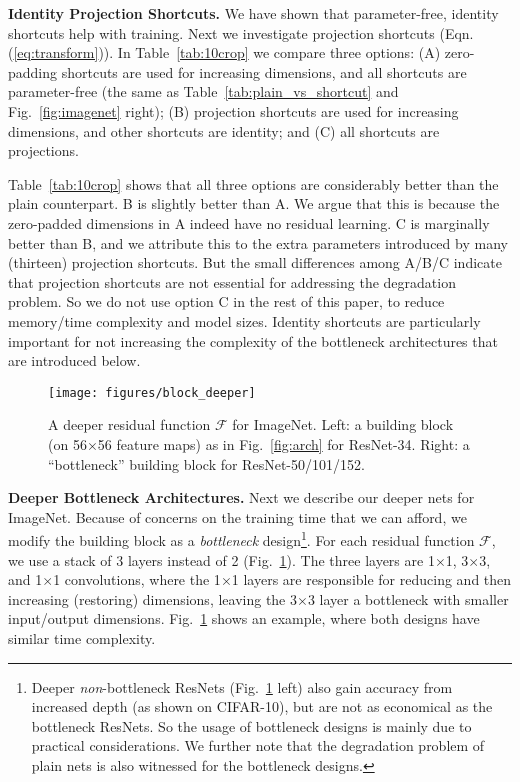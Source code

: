 \vspace{6pt}
\noindent\textbf{Identity \vs Projection Shortcuts.}
We have shown that parameter-free, identity shortcuts help with training. Next we investigate projection shortcuts (Eqn.(\ref{eq:transform})).
In Table~\ref{tab:10crop} we compare three options: (A) zero-padding shortcuts are used for increasing dimensions, and all shortcuts are parameter-free (the same as Table~\ref{tab:plain_vs_shortcut} and Fig.~\ref{fig:imagenet} right); (B) projection shortcuts are used for increasing dimensions, and other shortcuts are identity; and (C) all shortcuts are projections.

Table~\ref{tab:10crop} shows that all three options are considerably better than the plain counterpart.
B is slightly better than A. We argue that this is because the zero-padded dimensions in A indeed have no residual learning. C is marginally better than B, and we attribute this to the extra parameters introduced by many (thirteen) projection shortcuts. But the small differences among A/B/C indicate that projection shortcuts are not essential for addressing the degradation problem. So we do not use option C in the rest of this paper, to reduce memory/time complexity and model sizes. Identity shortcuts are particularly important for not increasing the complexity of the bottleneck architectures that are introduced below.


\begin{figure}[t]
\begin{center}
\hspace{12pt}
\texttt{[image: figures/block\_deeper]}
\end{center}
\caption{A deeper residual function $\mathcal{F}$ for ImageNet. Left: a building block (on 56$\times$56 feature maps) as in Fig.~\ref{fig:arch} for ResNet-34. Right: a ``bottleneck'' building block for ResNet-50/101/152.}
\label{fig:block_deeper}
\vspace{-.6em}
\end{figure}

\vspace{6pt}
\noindent\textbf{Deeper Bottleneck Architectures.} Next we describe our deeper nets for ImageNet. Because of concerns on the training time that we can afford, we modify the building block as a \emph{bottleneck} design\footnote{Deeper \emph{non}-bottleneck ResNets (Fig.~\ref{fig:block_deeper} left) also gain accuracy from increased depth (as shown on CIFAR-10), but are not as economical as the bottleneck ResNets. So the usage of bottleneck designs is mainly due to practical considerations. We further note that the degradation problem of plain nets is also witnessed for the bottleneck designs.}.
For each residual function $\mathcal{F}$, we use a stack of 3 layers instead of 2 (Fig.~\ref{fig:block_deeper}). The three layers are 1$\times$1, 3$\times$3, and 1$\times$1 convolutions, where the 1$\times$1 layers are responsible for reducing and then increasing (restoring) dimensions, leaving the 3$\times$3 layer a bottleneck with smaller input/output dimensions.
Fig.~\ref{fig:block_deeper} shows an example, where both designs have similar time complexity.

